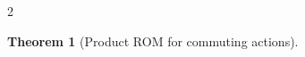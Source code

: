 \documentclass{article}
\newtheorem{theorem}{Theorem}[section]
\newtheorem{proof}{Proof}[theorem]
\newtheorem{lemma}[theorem]{Lemma}
\newcommand{\M}{\mathcal{M}}                                %
\newcommand{\g}{\mathfrak{g}}                               %
\newcommand{\appX}{\bar{X}}
\newcommand{\state}{x}
\newcommand{\appstate}{\bar{x}}
\begin{document}
\begin{multicols}{2}
\begin{theorem}[Product ROM for commuting actions]
\begin{enumerate}
    \end{enumerate}
\end{theorem}

\end{multicols}
\end{document}
